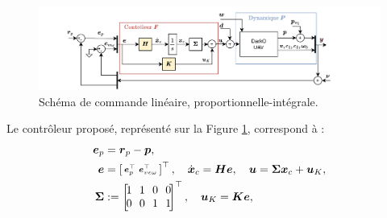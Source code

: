 \begin{figure}[ht!]
    \centering
    \includegraphics[trim=5cm 0cm 0cm 0cm,clip,width=1\columnwidth]{figures/commande_integrale_3DOF.png}
    \caption{Schéma de commande linéaire, proportionnelle-intégrale.}
    \label{fig:commande_int3DOF}
\end{figure}
Le contrôleur proposé, représenté sur la Figure \ref{fig:commande_int3DOF}, correspond à :
\begin{subequations}
    \label{eq:ctrl3dof}
    \begin{align}
        \boldsymbol{e}_{p} &= \boldsymbol{r}_{p} - \boldsymbol{p},\\
        \boldsymbol{e} &= \smallmat{
        \boldsymbol{e}_{p}^\top & \boldsymbol{e}_{v\epsilon\omega}^\top}^\top, \quad \dot{\boldsymbol{x}}_{c} = \boldsymbol{H} \boldsymbol{e}, \quad    \boldsymbol{u} = \boldsymbol{\Sigma} \boldsymbol{x}_{c} + \boldsymbol{u}_{K},
        \\
        \boldsymbol{\Sigma} &:= \begin{bmatrix} \! 1 \!&\! 1\! & \!0\! &\! 0\!\\ \!0\! & \!0\! & \!1 \!& \!1\!\end{bmatrix}^\top, \quad
        \boldsymbol{u}_{K} = \boldsymbol{K} \boldsymbol{e} ,
    \end{align}
\end{subequations}


